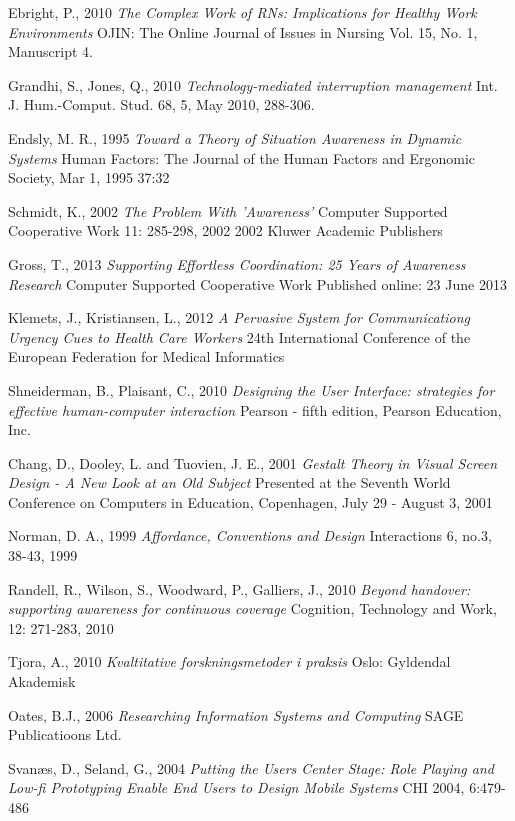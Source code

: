 \documentclass[b5paper, 11pt, norsk]{MScthesisITEM}
\begin{document}
\begin{thebibliography}{99}
Ebright, P., 2010
\emph {The Complex Work of RNs: Implications for Healthy Work Environments}
OJIN: The Online Journal of Issues in Nursing Vol. 15, No. 1, Manuscript 4.

Grandhi, S., Jones, Q., 2010
\emph {Technology-mediated interruption management} Int. J. Hum.-Comput. Stud. 68, 5, May 2010, 288-306.

Endsly, M. R., 1995
\emph{Toward a Theory of Situation Awareness in Dynamic Systems}
Human Factors: The Journal of the Human Factors and Ergonomic Society, Mar 1, 1995 37:32

Schmidt, K., 2002
\emph{The Problem With 'Awareness'}
Computer Supported Cooperative Work 11: 285-298, 2002
2002 Kluwer Academic Publishers

Gross, T., 2013
\emph{Supporting Effortless Coordination: 25 Years of Awareness Research}
Computer Supported Cooperative Work
Published online: 23 June 2013

Klemets, J., Kristiansen, L., 2012
\emph{A Pervasive System for Communicationg Urgency Cues to Health Care Workers}
24th International Conference of the European Federation for Medical Informatics

Shneiderman, B., Plaisant, C., 2010
\emph{Designing the User Interface: strategies for effective human-computer interaction}
Pearson - fifth edition, Pearson Education, Inc.

Chang, D., Dooley, L. and Tuovien, J. E., 2001
\emph{Gestalt Theory in Visual Screen Design - A New Look at an Old Subject}
Presented at the Seventh World Conference on Computers in Education, Copenhagen, July 29 - August 3, 2001

Norman, D. A., 1999
\emph{Affordance, Conventions and Design}
Interactions 6, no.3, 38-43, 1999

Randell, R., Wilson, S., Woodward, P., Galliers, J., 2010
\emph{Beyond handover: supporting awareness for continuous coverage} 
Cognition, Technology and Work, 12: 271-283, 2010 

Tjora, A., 2010 
\emph{Kvaltitative forskningsmetoder i praksis} 
Oslo: Gyldendal Akademisk

Oates, B.J., 2006 
\emph{Researching Information Systems and Computing} 
SAGE Publicatioons Ltd.

Svanæs, D., Seland, G., 2004 
\emph{Putting the Users Center Stage: Role Playing and Low-fi Prototyping Enable End Users to Design Mobile Systems} 
CHI 2004, 6:479-486


\end{thebibliography}
\end{document}
